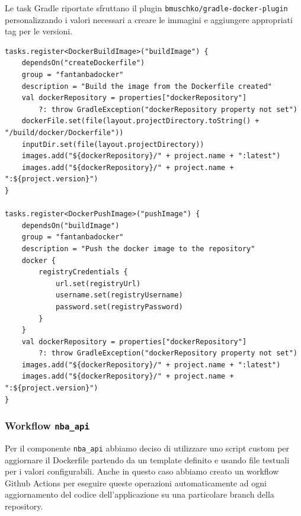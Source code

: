 Le task Gradle riportate sfruttano il plugin \texttt{bmuschko/gradle-docker-plugin} personalizzando i valori necessari a creare le immagini e aggiungere appropriati tag per le versioni.

\begin{verbatim}
tasks.register<DockerBuildImage>("buildImage") {
    dependsOn("createDockerfile")
    group = "fantanbadocker"
    description = "Build the image from the Dockerfile created"
    val dockerRepository = properties["dockerRepository"] 
        ?: throw GradleException("dockerRepository property not set")
    dockerFile.set(file(layout.projectDirectory.toString() + "/build/docker/Dockerfile"))
    inputDir.set(file(layout.projectDirectory))
    images.add("${dockerRepository}/" + project.name + ":latest")
    images.add("${dockerRepository}/" + project.name + ":${project.version}")
}

tasks.register<DockerPushImage>("pushImage") {
    dependsOn("buildImage")
    group = "fantanbadocker"
    description = "Push the docker image to the repository"
    docker {
        registryCredentials {
            url.set(registryUrl)
            username.set(registryUsername)
            password.set(registryPassword)
        }
    }
    val dockerRepository = properties["dockerRepository"]
        ?: throw GradleException("dockerRepository property not set")
    images.add("${dockerRepository}/" + project.name + ":latest")
    images.add("${dockerRepository}/" + project.name + ":${project.version}")
}
\end{verbatim}

\subsubsection{Workflow \texttt{nba\_api}}
Per il componente \texttt{nba\_api} abbiamo deciso di utilizzare uno script custom per aggiornare il Dockerfile partendo da un template definito e usando file testuali per i valori configurabili. Anche in questo caso abbiamo creato un workflow Github Actions per eseguire queste operazioni automaticamente ad ogni aggiornamento del codice dell'applicazione su una particolare branch della repository.

